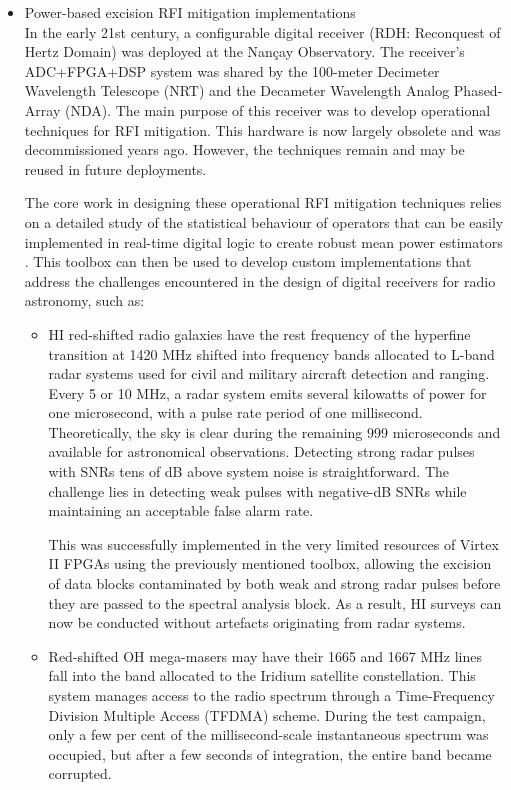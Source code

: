 \begin{itemize}
\item Power-based excision RFI mitigation implementations\\

In the early 21st century, a configurable digital receiver (RDH: Reconquest of Hertz Domain) was deployed at the Nançay Observatory. The receiver's ADC+FPGA+DSP system was shared by the 100-meter Decimeter Wavelength Telescope (NRT) and the Decameter Wavelength Analog Phased-Array (NDA). The main purpose of this receiver was to develop operational techniques for RFI mitigation. This hardware is now largely obsolete and was decommissioned years ago. However, the techniques remain and may be reused in future deployments.

The core work in designing these operational RFI mitigation techniques relies on a detailed study of the statistical behaviour of operators that can be easily implemented in real-time digital logic to create robust mean power estimators \citep{dumezviou:tel-00319939}. This toolbox can then be used to develop custom implementations that address the challenges encountered in the design of digital receivers for radio astronomy, such as:

\begin{itemize}
\item HI red-shifted radio galaxies have the rest frequency of the hyperfine transition at 1420 MHz shifted into frequency bands allocated to L-band radar systems used for civil and military aircraft detection and ranging. Every 5 or 10 MHz, a radar system emits several kilowatts of power for one microsecond, with a pulse rate period of one millisecond. Theoretically, the sky is clear during the remaining 999 microseconds and available for astronomical observations. Detecting strong radar pulses with SNRs tens of dB above system noise is straightforward. The challenge lies in detecting weak pulses with negative-dB SNRs while maintaining an acceptable false alarm rate.

This was successfully implemented in the very limited resources of Virtex II FPGAs using the previously mentioned toolbox, allowing the excision of data blocks contaminated by both weak and strong radar pulses before they are passed to the spectral analysis block. As a result, HI surveys can now be conducted without artefacts originating from radar systems.


\item Red-shifted OH mega-masers may have their 1665 and 1667 MHz lines fall into the band allocated to the Iridium satellite constellation. This system manages access to the radio spectrum through a Time-Frequency Division Multiple Access (TFDMA) scheme. During the test campaign, only a few per cent of the millisecond-scale instantaneous spectrum was occupied, but after a few seconds of integration, the entire band became corrupted.


\end{itemize}
\end{itemize}
